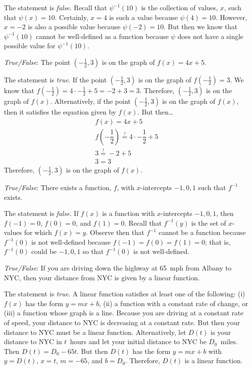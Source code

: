 \documentclass[11pt,letterpaper]{article}
\begin{document}
\sol The statement is \textit{false}. Recall that $\psi^{-1}(10)$ is the collection of values, $x$, such that $\psi(x)= 10$. Certainly, $x= 4$ is such a value because $\psi(4)= 10$. However, $x= -2$ is also a possible value because $\psi(-2)= 10$. But then we know that $\psi^{-1}(10)$ cannot be well-defined as a function because $\psi$ does not have a single possible value for $\psi^{-1}(10)$. \pvspace{1.3cm}



\quizsol \textit{True/False}: The point $(-\frac{1}{2}, 3)$ is on the graph of $f(x)= 4x + 5$. \pspace

\sol The statement is \textit{true}. If the point $(-\frac{1}{2}, 3)$ is on the graph of $f(-\frac{1}{2})= 3$. We know that $f \left( -\frac{1}{2} \right)= 4 \cdot -\frac{1}{2} + 5= -2 + 3= 3$. Therefore, $(-\frac{1}{2}, 3)$ is on the graph of $f(x)$. Alternatively, if the point $(-\frac{1}{2}, 3)$ is on the graph of $f(x)$, then it satisfies the equation given by $f(x)$. But then\dots
	\[
	\begin{gathered}
	f(x)= 4x + 5 \\
	f \left( -\dfrac{1}{2} \right) \stackrel{?}{=} 4 \cdot -\dfrac{1}{2} + 5 \\
	3 \stackrel{?}{=} -2 + 5 \\
	3= 3
	\end{gathered}
	\]
 Therefore, $(-\frac{1}{2}, 3)$ is on the graph of $f(x)$. \pvspace{1.3cm}
 


\quizsol \textit{True/False}: There exists a function, $f$, with $x$-intercepts $-1, 0, 1$ such that $f^{-1}$ exists. \pspace

\sol The statement is \textit{false}. If $f(x)$ is a function with $x$-intercepts $-1, 0, 1$, then $f(-1)= 0$, $f(0)= 0$, and $f(1)= 0$. Recall that $f^{-1}(y)$ is the set of $x$-values for which $f(x)= y$. Observe then that $f^{-1}$ cannot be a function because $f^{-1}(0)$ is not well-defined because $f(-1)= f(0)= f(1)= 0$; that is, $f^{-1}(0)$ could be $-1, 0, 1$ so that $f^{-1}(0)$ is not well-defined. \pvspace{1.3cm}



\quizsol \textit{True/False}: If you are driving down the highway at 65~mph from Albany to NYC, then your distance from NYC is given by a linear function. \pspace

\sol The statement is \textit{true}. A linear function satisfies at least one of the following: (i) $f(x)$ has the form $y= mx + b$, (ii) a function with a constant rate of change, or (iii) a function whose graph is a line. Because you are driving at a constant rate of speed, your distance to NYC is decreasing at a constant rate. But then your distance to NYC must be a linear function. Alternatively, let $D(t)$ is your distance to NYC in $t$~hours and let your initial distance to NYC be $D_0$~miles. Then $D(t)= D_0 - 65t$. But then $D(t)$ has the form $y= mx + b$ with $y= D(t)$, $x= t$, $m= -65$, and $b= D_0$. Therefore, $D(t)$ is a linear function. \pvspace{1.3cm}
\end{document}
